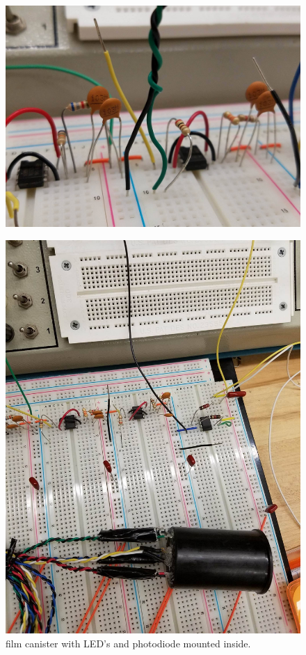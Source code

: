 \documentclass[paper=letter, fontsize=12pt]{article}
\begin{document}
\begin{figure}[H]
\begin{minipage}{.3\textwidth}
  \includegraphics[width=.99\linewidth]{rawtimers.jpg}
  \label{rawtimers}
\end{minipage}
\end{figure}



\begin{figure}[H]
	\centering
	\includegraphics[scale = .09]{filmcanister.jpg}
	\caption{film canister with LED's and photodiode mounted inside.}
	\label{filmcanister}
\end{figure}
\end{document}
